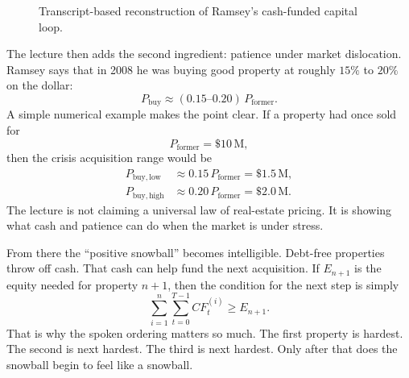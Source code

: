 \begin{figure}[h]
\centering
{}
\caption{Transcript-based reconstruction of Ramsey's cash-funded capital loop.}
\end{figure}

The lecture then adds the second ingredient: patience under market dislocation. Ramsey says that in 2008 he was buying good property at roughly \(15\%\) to \(20\%\) on the dollar:
\begin{equation}
P_{\mathrm{buy}} \approx (0.15\text{--}0.20)\,P_{\mathrm{former}}.
\end{equation}
A simple numerical example makes the point clear. If a property had once sold for
\[
P_{\mathrm{former}}=\$10\,\mathrm{M},
\]
then the crisis acquisition range would be
\begin{align}
P_{\mathrm{buy,low}} &\approx 0.15\,P_{\mathrm{former}}=\$1.5\,\mathrm{M},\\
P_{\mathrm{buy,high}} &\approx 0.20\,P_{\mathrm{former}}=\$2.0\,\mathrm{M}.
\end{align}
The lecture is not claiming a universal law of real-estate pricing. It is showing what cash and patience can do when the market is under stress.

From there the ``positive snowball'' becomes intelligible. Debt-free properties throw off cash. That cash can help fund the next acquisition. If \(E_{n+1}\) is the equity needed for property \(n+1\), then the condition for the next step is simply
\begin{equation}
\sum_{i=1}^{n}\sum_{t=0}^{T-1} CF_t^{(i)} \ge E_{n+1}.
\end{equation}
That is why the spoken ordering matters so much. The first property is hardest. The second is next hardest. The third is next hardest. Only after that does the snowball begin to feel like a snowball.

